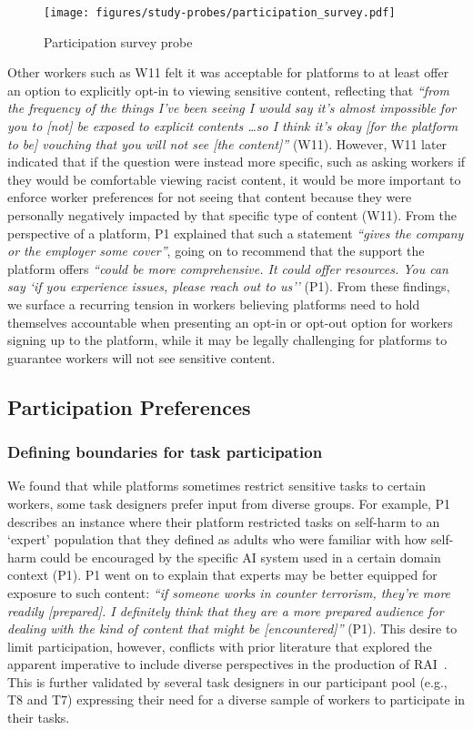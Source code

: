 \begin{figure}[htbp]
    \centering
    \texttt{[image: figures/study-probes/participation\_survey.pdf]}     
    \caption{Participation survey probe}
    \label{fig:participation-survey} 
\end{figure}

Other workers such as W11 felt it was acceptable for platforms to at least offer an option to explicitly opt-in to viewing sensitive content, reflecting that \textit{``from the frequency of the things I've been seeing I would say it's almost impossible for you to [not] be exposed to explicit contents \dots so I think it's okay [for the platform to be] vouching that you will not see [the content]''} (W11). However, W11 later indicated that if the question were instead more specific, such as asking workers if they would be comfortable viewing racist content, it would be more important to enforce worker preferences for not seeing that content because they were personally negatively impacted by that specific type of content (W11). From the perspective of a platform, P1 explained that such a statement \textit{``gives the company or the employer some cover''}, going on to recommend that the support the platform offers \textit{``could be more comprehensive. It could offer resources. You can say `if you experience issues, please reach out to us''} (P1). From these findings, we surface a recurring tension in workers believing platforms need to hold themselves accountable when presenting an opt-in or opt-out option for workers signing up to the platform, while it may be legally challenging for platforms to guarantee workers will not see sensitive content.
 
\subsection{Participation Preferences}
\subsubsection{Defining boundaries for task participation}
We found that while platforms sometimes restrict sensitive tasks to certain workers, some task designers prefer input from diverse groups. For example, P1 describes an instance where their platform restricted tasks on self-harm to an `expert' population that they defined as adults who were familiar with how self-harm could be encouraged by the specific AI system used in a certain domain context (P1). P1 went on to explain that experts may be better equipped for exposure to such content: \textit{``if someone works in counter terrorism, they're more readily [prepared]. I definitely think that they are a more prepared audience for dealing with the kind of content that might be [encountered]''} (P1). This desire to limit participation, however, conflicts with prior literature that explored the apparent imperative to include diverse perspectives in the production of RAI~\cite{qian2025locating, dalal2024provocation}. This is further validated by several task designers in our participant pool (e.g., T8 and T7) expressing their need for a diverse sample of workers to participate in their tasks. 

